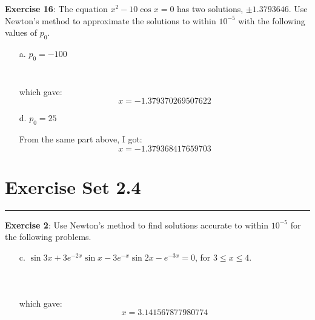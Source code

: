 \documentclass{article}
\begin{document}
\textbf{Exercise 16}: The equation $x^{2} - 10 \cos{x} = 0$ has two solutions, $\pm 1.3793646$. Use Newton's method to approximate the solutions to within $10^{-5}$ with the following values of $p_{0}$.
    \begin{itemize}
        \item [a.] $p_{0} = -100$
            \begin{answer}
                \inputminted{matlab}{newton/myfunc2.m}
                \inputminted{matlab}{newton/script2.m}
                which gave:
                    \begin{equation*}
                        x = -1.379370269507622
                    \end{equation*}
            \end{answer}

        \item [d.] $p_{0} = 25$
            \begin{answer}
                From the same part above, I got:
                    \begin{equation*}
                        x = -1.379368417659703
                    \end{equation*}
            \end{answer}
    \end{itemize}

\newpage
\section*{Exercise Set 2.4}
\hrule

\textbf{Exercise 2}: Use Newton's method to find solutions accurate to within $10^{-5}$ for the following problems.
    \begin{itemize}
        \item [c.] $\sin{3x} + 3e^{-2x}\sin{x} - 3e^{-x}\sin{2x} - e^{-3x} = 0$, for $3 \leq x \leq 4$.
            \begin{answer}
                \inputminted{matlab}{newton/newton.m}
                \inputminted{matlab}{newton/myfunc3.m}
                \inputminted{matlab}{newton/script3.m}
                which gave:
                    \begin{equation*}
                        x = 3.141567877980774
                    \end{equation*}
            \end{answer}
    \end{itemize}
\end{document}
